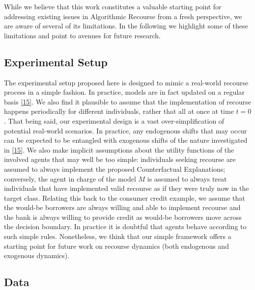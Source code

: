 \documentclass[
  conference]{IEEEtran}
\begin{document}
While we believe that this work constitutes a valuable starting point
for addressing existing issues in Algorithmic Recourse from a fresh
perspective, we are aware of several of its limitations. In the
following we highlight some of these limitations and point to avenues
for future research.

\hypertarget{experimental-setup}{%
\subsection{Experimental Setup}\label{experimental-setup}}

The experimental setup proposed here is designed to mimic a real-world
recourse process in a simple fashion. In practice, models are in fact
updated on a regular basis
\protect\hyperlink{ref-upadhyay2021towards}{{[}15{]}}. We also find it
plausible to assume that the implementation of recourse happens
periodically for different individuals, rather that all at once at time
\(t=0\). That being said, our experimental design is a vast
over-simplification of potential real-world scenarios. In practice, any
endogenous shifts that may occur can be expected to be entangled with
exogenous shifts of the nature investigated in
\protect\hyperlink{ref-upadhyay2021towards}{{[}15{]}}. We also make
implicit assumptions about the utility functions of the involved agents
that may well be too simple: individuals seeking recourse are assumed to
always implement the proposed Counterfactual Explanations; conversely,
the agent in charge of the model \(M\) is assumed to always treat
individuals that have implemented valid recourse as if they were truly
now in the target class. Relating this back to the consumer credit
example, we assume that the would-be borrowers are always willing and
able to implement recourse and the bank is always willing to provide
credit as would-be borrowers move across the decision boundary. In
practice it is doubtful that agents behave according to such simple
rules. Nonetheless, we think that our simple framework offers a starting
point for future work on recourse dynamics (both endogenous and
exogenous dynamics).

\hypertarget{sec-limit-data}{%
\subsection{Data}\label{sec-limit-data}}
\end{document}
